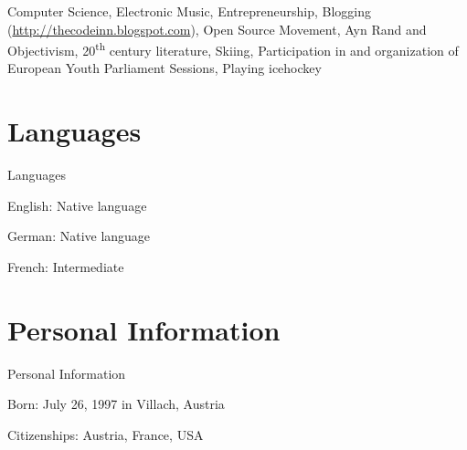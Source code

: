 \begin{body}
Computer Science, Electronic Music, Entrepreneurship, Blogging (\href{http://thecodeinn.blogspot.com}{http://thecodeinn.blogspot.com}), Open Source Movement, Ayn Rand and Objectivism, 20\textsuperscript{th} century literature, Skiing, Participation in and organization of European Youth Parliament Sessions, Playing icehockey


\section{Languages}
{Languages}

English: Native language
\par
German: Native language
\par
French: Intermediate


\section{Personal Information}
{Personal Information}

Born: July 26, 1997 in Villach, Austria
\par
Citizenships: Austria, France, USA

\end{body}


